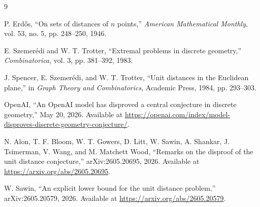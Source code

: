 \documentclass[a4paper,12pt]{article}
\begin{document}
\begin{thebibliography}{9}

P. Erd\H{o}s, ``On sets of distances of $n$ points,'' \emph{American Mathematical Monthly}, vol. 53, no. 5, pp. 248--250, 1946.

E. Szemer\'edi and W. T. Trotter, ``Extremal problems in discrete geometry,'' \emph{Combinatorica}, vol. 3, pp. 381--392, 1983.

J. Spencer, E. Szemer\'edi, and W. T. Trotter, ``Unit distances in the Euclidean plane,'' in \emph{Graph Theory and Combinatorics}, Academic Press, 1984, pp. 293--303.

OpenAI, ``An OpenAI model has disproved a central conjecture in discrete geometry,'' May 20, 2026.  Available at \url{https://openai.com/index/model-disproves-discrete-geometry-conjecture/}.

N. Alon, T. F. Bloom, W. T. Gowers, D. Litt, W. Sawin, A. Shankar, J. Tsimerman, V. Wang, and M. Matchett Wood, ``Remarks on the disproof of the unit distance conjecture,'' arXiv:2605.20695, 2026.  Available at \url{https://arxiv.org/abs/2605.20695}.

W. Sawin, ``An explicit lower bound for the unit distance problem,'' arXiv:2605.20579, 2026.  Available at \url{https://arxiv.org/abs/2605.20579}.

\end{thebibliography}
\end{document}
